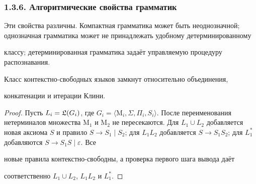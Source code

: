 \documentclass[mathserif,12pt,aspectratio=169]{beamer}
\begin{document}
\begin{frame}[t]
	\frametitle{1.3.6. Алгоритмические свойства грамматик }
	\setlength{\parskip}{1pt}
	\sloppy
	
	
	
	\begin{remark}
		Эти свойства различны. Компактная грамматика может быть неоднозначной; однозначная грамматика может не принадлежать удобному детерминированному
		
		классу; детерминированная грамматика задаёт управляемую процедуру распознавания.
	\end{remark}
	
	\begin{theorem}
		Класс контекстно-свободных языков замкнут относительно объединения,
		
		конкатенации и итерации Клини.
	\end{theorem}
	
	\begin{proof}
		\par\vspace{-4pt}
		Пусть $L_i=\frak{L}(G_i)$, где $G_i=\langle \mathrm{M}_i,\Sigma,\Pi_i,S_i\rangle$. После переименования нетерминалов множества $\mathrm{M}_1$ и $\mathrm{M}_2$ не пересекаются. Для $L_1\cup L_2$ добавляется новая аксиома $S$ и правило $S\to S_1\mid S_2$; для $L_1L_2$ добавляется $S\to S_1S_2$; для $L_1^*$ добавляются $S\to S_1S\mid\varepsilon$. Все
		
		новые правила контекстно-свободны, а проверка первого шага вывода даёт
		
		соответственно $L_1\cup L_2$, $L_1L_2$ и $L_1^*$.
	\end{proof}
	
\end{frame}
\end{document}
